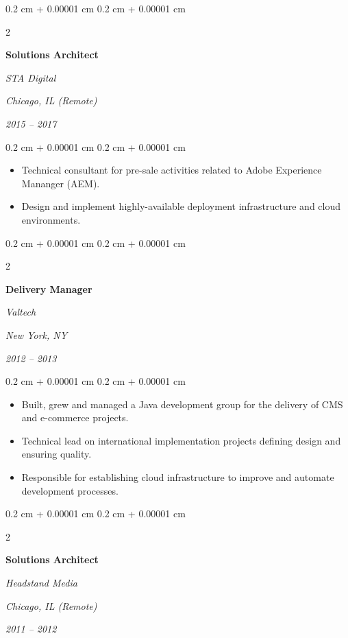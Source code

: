 \documentclass[10pt, letterpaper]{article}
\newenvironment{highlights}{
    \begin{itemize}[
        topsep=0.10 cm,
        parsep=0.10 cm,
        partopsep=0pt,
        itemsep=0pt,
        leftmargin=0.4 cm + 10pt
    ]
}{
    \end{itemize}
} %
\newenvironment{onecolentry}{
    \begin{adjustwidth}{
        0.2 cm + 0.00001 cm
    }{
        0.2 cm + 0.00001 cm
    }
}{
    \end{adjustwidth}
} %
\newenvironment{twocolentry}[2][]{
    \onecolentry
    \def\secondColumn{#2}
    \setcolumnwidth{\fill, 8 cm}
    \begin{paracol}{2}
}{
    \switchcolumn \raggedleft \secondColumn
    \end{paracol}
    \endonecolentry
} %
\begin{document}
\vspace{0.20 cm}



%
%
\begin{twocolentry}{
        \textit{Chicago, IL (Remote)}

        \textit{2015 – 2017}}
    \textbf{Solutions Architect}

    \textit{STA Digital}
\end{twocolentry}

\vspace{0.10 cm}
\begin{onecolentry}
    \begin{highlights}
        \item Technical consultant for pre-sale activities related to Adobe Experience Mananger (AEM).
        \item Design and implement highly-available deployment infrastructure and cloud environments.
    \end{highlights}
\end{onecolentry}

\vspace{0.20 cm}



%
%
\begin{twocolentry}{
        \textit{New York, NY}

        \textit{2012 – 2013}}
    \textbf{Delivery Manager}

    \textit{Valtech}
\end{twocolentry}

\vspace{0.10 cm}
\begin{onecolentry}
    \begin{highlights}
        \item Built, grew and managed a Java development group for the delivery of CMS and e-commerce projects.
        \item Technical lead on international implementation projects defining design and ensuring quality.
        \item Responsible for establishing cloud infrastructure to improve and automate development processes.
    \end{highlights}
\end{onecolentry}

\vspace{0.20 cm}



%
%
\begin{twocolentry}{
        \textit{Chicago, IL (Remote)}

        \textit{2011 – 2012}}
    \textbf{Solutions Architect}

    \textit{Headstand Media}
\end{twocolentry}
\end{document}
